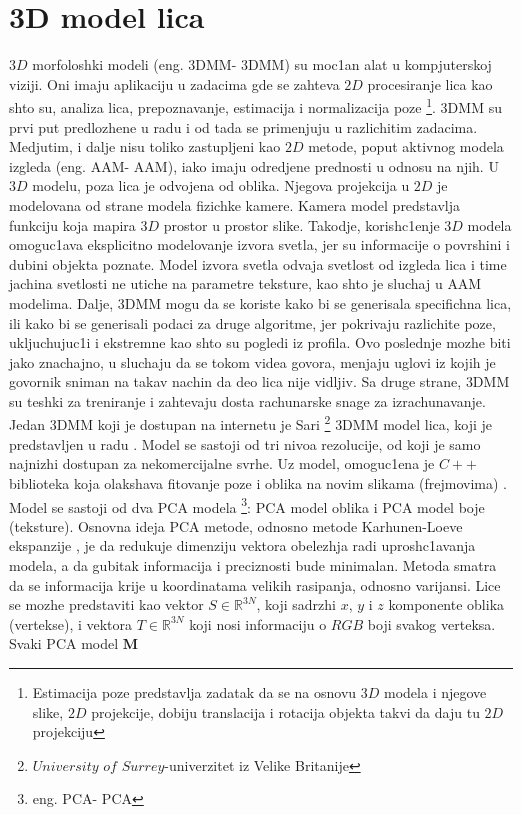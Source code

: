 \documentclass[a4paper, openany, oneside, 11pt]{book}
\begin{document}
\section[$3D$ model lica]{$\mathbf{3D}$ model lica}
$3D$  morfoloshki modeli  (eng. \acrlong{3DMM}- \acrshort{3DMM}) su moc1an alat u kompjuterskoj viziji. Oni imaju aplikaciju u zadacima gde se zahteva $2D$ procesiranje lica kao shto su, analiza lica, prepoznavanje, estimacija i normalizacija poze \footnote{Estimacija poze predstavlja zadatak da se na osnovu $3D$ modela i njegove slike, $2D$ projekcije, dobiju translacija i rotacija objekta takvi da daju tu $2D$ projekciju}. \acrshort{3DMM} su prvi put predlozhene u radu \cite{3DMM} i od tada se primenjuju u razlichitim zadacima. Medjutim, i dalje nisu toliko zastupljeni kao $2D$ metode, poput aktivnog modela izgleda \cite{AAM} (eng. \acrlong{AAM}- \acrshort{AAM}), iako imaju odredjene prednosti u odnosu na njih. U $3D$ modelu, poza lica je odvojena od oblika. Njegova projekcija u $2D$ je modelovana od strane modela fizichke kamere. Kamera model predstavlja funkciju koja mapira $3D$ prostor u prostor slike. Takodje, korish\-c1enje $3D$ modela omoguc1ava eksplicitno modelovanje izvora svetla, jer su informacije o povrshini i dubini objekta poznate. Model izvora svetla odvaja svetlost od izgleda lica i time jachina svetlosti ne utiche na parametre teksture, kao shto je sluchaj u \acrshort{AAM} modelima. Dalje, \acrshort{3DMM} mogu da se koriste kako bi se generisala specifichna lica, ili kako bi se generisali podaci za druge algoritme, jer pokrivaju razlichite poze, ukljuchujuc1i i ekstremne kao shto su pogledi iz profila. Ovo poslednje mozhe biti jako znachajno, u sluchaju da se tokom videa govora, menjaju uglovi iz kojih je govornik sniman na takav nachin da deo lica nije vidljiv. Sa druge strane, \acrshort{3DMM} su teshki za treniranje i zahtevaju dosta rachunarske snage za izrachunavanje.\\
Jedan \acrshort{3DMM} koji je dostupan na internetu je Sari \footnote{$University$ $of$ $Surrey$-univerzitet iz Velike Britanije} \acrshort{3DMM} model lica, koji je predstavljen u radu \cite{SFM}. Model se sastoji od tri nivoa rezolucije, od koji je samo najnizhi dostupan za nekomercijalne svrhe. Uz model, omoguc1ena je $C++$ biblioteka koja olakshava fitovanje poze i oblika na novim slikama (frejmovima) \cite{eos}.\\
Model se sastoji od dva \acrshort{PCA} modela \footnote{eng. \acrshort{PCA}- \acrlong{PCA}}: \acrshort{PCA} model oblika i \acrshort{PCA} model boje (teksture). Osnovna ideja \acrshort{PCA} metode, odnosno metode Karhunen-Loeve ekspanzije \cite{POpredavanja}, je da redukuje dimenziju vektora obelezhja radi uprosh\-c1avanja modela, a da gubitak informacija i preciznosti bude minimalan. Metoda smatra da se informacija krije u koordinatama velikih rasipanja, odnosno varijansi. Lice se mozhe predstaviti kao vektor $S\in\mathbb{R}^{3N}$, koji sadrzhi $x$, $y$ i $z$ komponente oblika (vertekse), i vektora $T\in\mathbb{R}^{3N}$ koji nosi informaciju o $RGB$ boji svakog verteksa. Svaki \acrshort{PCA} model $\mathbf{M}$
\end{document}
